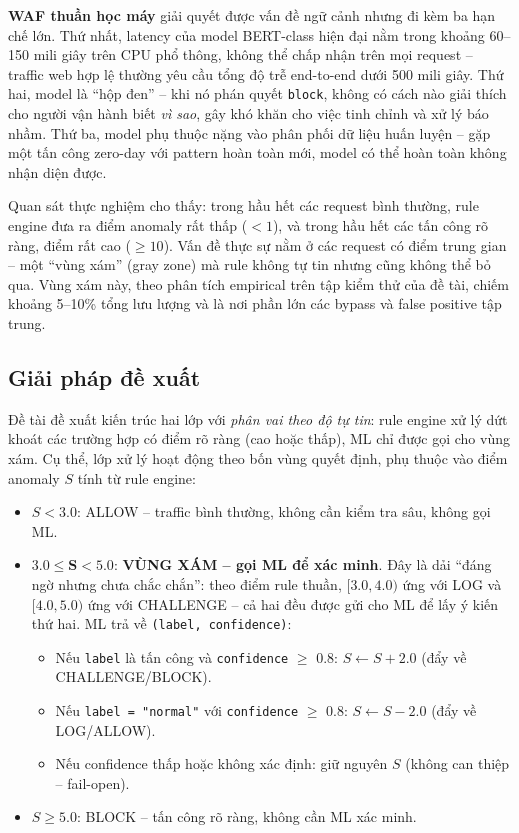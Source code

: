 \documentclass[../DoAn.tex]{subfiles}
\begin{document}
\textbf{WAF thuần học máy} giải quyết được vấn đề ngữ cảnh nhưng đi kèm
ba hạn chế lớn. Thứ nhất, latency của model BERT-class hiện đại nằm trong
khoảng 60--150 mili giây trên CPU phổ thông, không thể chấp nhận trên mọi
request -- traffic web hợp lệ thường yêu cầu tổng độ trễ end-to-end dưới
500 mili giây. Thứ hai, model là ``hộp đen'' -- khi nó phán quyết
\texttt{block}, không có cách nào giải thích cho người vận hành biết
\textit{vì sao}, gây khó khăn cho việc tinh chỉnh và xử lý báo nhầm. Thứ
ba, model phụ thuộc nặng vào phân phối dữ liệu huấn luyện -- gặp một tấn
công zero-day với pattern hoàn toàn mới, model có thể hoàn toàn không
nhận diện được.

Quan sát thực nghiệm cho thấy: trong hầu hết các request bình thường, rule
engine đưa ra điểm anomaly rất thấp (\(< 1\)), và trong hầu hết các tấn
công rõ ràng, điểm rất cao (\(\ge 10\)). Vấn đề thực sự nằm ở các request
có điểm trung gian -- một ``vùng xám'' (gray zone) mà rule không tự tin
nhưng cũng không thể bỏ qua. Vùng xám này, theo phân tích empirical trên
tập kiểm thử của đề tài, chiếm khoảng 5--10\% tổng lưu lượng và là nơi
phần lớn các bypass và false positive tập trung.

\subsection{Giải pháp đề xuất}
\label{subsection:5.1.2}

Đề tài đề xuất kiến trúc hai lớp với \textit{phân vai theo độ tự tin}: rule
engine xử lý dứt khoát các trường hợp có điểm rõ ràng (cao hoặc thấp), ML
chỉ được gọi cho vùng xám. Cụ thể, lớp xử lý hoạt động theo bốn vùng quyết
định, phụ thuộc vào điểm anomaly \(S\) tính từ rule engine:

\begin{itemize}[leftmargin=*]
    \item \(S < 3.0\): ALLOW -- traffic bình thường, không cần kiểm tra
    sâu, không gọi ML.

    \item \(\mathbf{3.0 \le S < 5.0}\): \textbf{VÙNG XÁM -- gọi ML để xác
    minh}. Đây là dải ``đáng ngờ nhưng chưa chắc chắn'': theo điểm rule thuần,
    \([3.0, 4.0)\) ứng với LOG và \([4.0, 5.0)\) ứng với CHALLENGE -- cả hai đều
    được gửi cho ML để lấy ý kiến thứ hai. ML trả về \texttt{(label, confidence)}:
    \begin{itemize}
        \item Nếu \texttt{label} là tấn công và \texttt{confidence} \(\ge\)
        0.8: \(S \leftarrow S + 2.0\) (đẩy về CHALLENGE/BLOCK).
        \item Nếu \texttt{label = "normal"} với \texttt{confidence} \(\ge\)
        0.8: \(S \leftarrow S - 2.0\) (đẩy về LOG/ALLOW).
        \item Nếu confidence thấp hoặc không xác định: giữ nguyên \(S\)
        (không can thiệp -- fail-open).
    \end{itemize}

    \item \(S \ge 5.0\): BLOCK -- tấn công rõ ràng, không cần ML xác minh.
\end{itemize}
\end{document}
